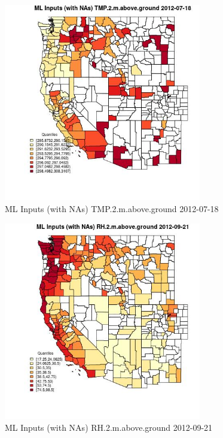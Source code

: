 \begin{figure} 
\centering  
\includegraphics[width=0.77\textwidth]{Code_Outputs/Report_ML_input_PM25_Step4_part_e_de_duplicated_aves_compiled_2019-05-14wNAs_CountyTMP2mabovegroundMean2012-07-18_2012-07-18.jpg} 
\caption{\label{fig:Report_ML_input_PM25_Step4_part_e_de_duplicated_aves_compiled_2019-05-14wNAsCountyTMP2mabovegroundMean2012-07-18_2012-07-18}ML Inputs (with NAs) TMP.2.m.above.ground 2012-07-18} 
\end{figure} 
 

\begin{figure} 
\centering  
\includegraphics[width=0.77\textwidth]{Code_Outputs/Report_ML_input_PM25_Step4_part_e_de_duplicated_aves_compiled_2019-05-14wNAs_CountyRH2mabovegroundMean2012-09-21_2012-09-21.jpg} 
\caption{\label{fig:Report_ML_input_PM25_Step4_part_e_de_duplicated_aves_compiled_2019-05-14wNAsCountyRH2mabovegroundMean2012-09-21_2012-09-21}ML Inputs (with NAs) RH.2.m.above.ground 2012-09-21} 
\end{figure} 
 

